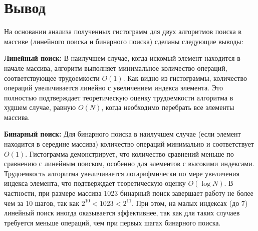 \clearpage
\section*{Вывод}

На основании анализа полученных гистограмм для двух алгоритмов поиска в массиве (линейного поиска и бинарного поиска) сделаны следующие выводы:

\textbf{Линейный поиск:}
В наилучшем случае, когда искомый элемент находится в начале массива, алгоритм выполняет минимальное количество операций, соответствующее трудоемкости $O(1)$. Как видно из гистограммы, количество операций увеличивается линейно с увеличением индекса элемента. Это полностью подтверждает теоретическую оценку трудоемкости алгоритма в худшем случае, равную $O(N)$, когда необходимо перебрать все элементы массива.

\textbf{Бинарный поиск:}
Для бинарного поиска в наилучшем случае (если элемент находится в середине массива) количество операций минимально и соответствует $O(1)$. Гистограмма демонстрирует, что количество сравнений меньше по сравнению с линейным поиском, особенно для элементов с высокими индексами. Трудоемкость алгоритма увеличивается логарифмически по мере увеличения индекса элемента, что подтверждает теоретическую оценку $O(\log N)$. В частности, при размере массива 1023 бинарный поиск завершает работу не более чем за 10 шагов, так как $2^{10} < 1023 < 2^{11}$. При этом, на малых индексах (до $7$) линейный поиск иногда оказывается эффективнее, так как для таких случаев требуется меньше операций, чем при первых шагах бинарного поиска.

\clearpage